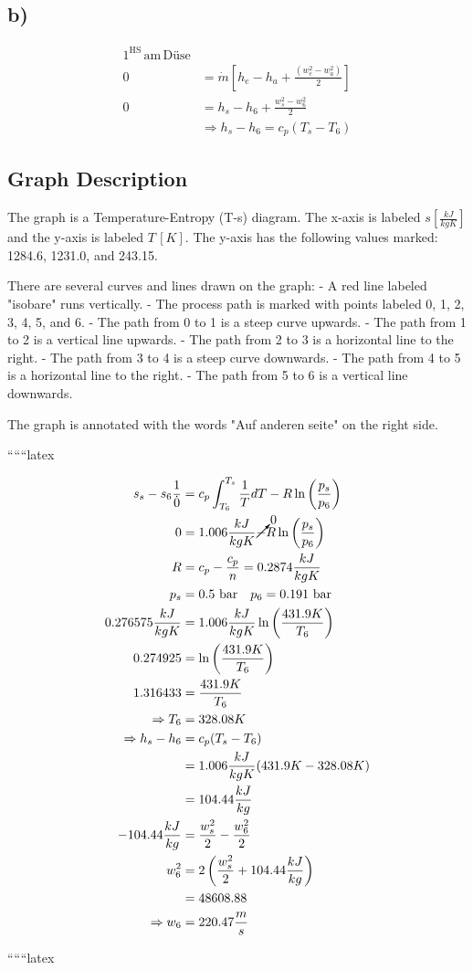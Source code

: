 

\subsection*{b)}
\begin{align*}
    1^{\text{HS}} \, \text{am} \, \text{Düse} \\
    0 &= \dot{m} \left[ h_e - h_a + \frac{(w_e^2 - w_a^2)}{2} \right] \\
    0 &= h_s - h_6 + \frac{w_s^2 - w_6^2}{2} \\
    &\Rightarrow h_s - h_6 = c_p (T_s - T_6)
\end{align*}

\subsection*{Graph Description}
The graph is a Temperature-Entropy (T-s) diagram. The x-axis is labeled $s \left[ \frac{kJ}{kgK} \right]$ and the y-axis is labeled $T \, [K]$. The y-axis has the following values marked: 1284.6, 1231.0, and 243.15. 

There are several curves and lines drawn on the graph:
- A red line labeled "isobare" runs vertically.
- The process path is marked with points labeled 0, 1, 2, 3, 4, 5, and 6.
- The path from 0 to 1 is a steep curve upwards.
- The path from 1 to 2 is a vertical line upwards.
- The path from 2 to 3 is a horizontal line to the right.
- The path from 3 to 4 is a steep curve downwards.
- The path from 4 to 5 is a horizontal line to the right.
- The path from 5 to 6 is a vertical line downwards.

The graph is annotated with the words "Auf anderen seite" on the right side.

``````latex


\begin{align*}
s_s - s_6 \frac{1}{\dot{0}} &= c_p \int_{T_6}^{T_s} \frac{1}{T} dT - R \ln \left( \frac{p_s}{p_6} \right) \\
0 &= 1.006 \frac{kJ}{kgK} \cancelto{0} - R \ln \left( \frac{p_s}{p_6} \right) \\
R &= c_p - \frac{c_p}{n} = 0.2874 \frac{kJ}{kgK} \\
p_s &= 0.5 \text{ bar} \quad p_6 = 0.191 \text{ bar} \\
0.276575 \frac{kJ}{kgK} &= 1.006 \frac{kJ}{kgK} \ln \left( \frac{431.9 K}{T_6} \right) \\
0.274925 &= \ln \left( \frac{431.9 K}{T_6} \right) \\
1.316433 &= \frac{431.9 K}{T_6} \\
\Rightarrow T_6 &= 328.08 K \\
\Rightarrow h_s - h_6 &= c_p (T_s - T_6) \\
&= 1.006 \frac{kJ}{kgK} (431.9 K - 328.08 K) \\
&= 104.44 \frac{kJ}{kg} \\
-104.44 \frac{kJ}{kg} &= \frac{w_s^2}{2} - \frac{w_6^2}{2} \\
w_6^2 &= 2 \left( \frac{w_s^2}{2} + 104.44 \frac{kJ}{kg} \right) \\
&= 48608.88 \\
\Rightarrow w_6 &= 220.47 \frac{m}{s}
\end{align*}

``````latex